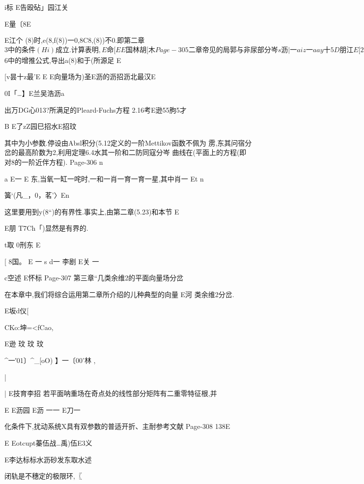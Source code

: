 {{{{{{{{{{{{{{{{i标
E告殴砧」园江关

E量〔8E

E江个
(8)时,e(8,f(8))一0,8C8,(8))不0.即第二章$3中的条件

(Hi)成立.计算表明,

E
命
[
E
E国林胡
[木
Page-305
二章帝见的局郭与非尿部分岑

s沥
|一aiz一aay十5
D朋
江E
[
2.7证明定理.15.
E芸沥
功,服有(一0试问显咏必有8「(旭不09
2.9试用定理6.3木求方程组
乏_一j=一z一′】+灼z+炮z仪十灼鹦狮
E李沥
ctutuota
d
2.11试证(6,30)式中的丿和双都是公式(6.29中丁(的简单
E伟江口

2.13对5.15),试用$6中的增推公式,导出a(8)和于(所源足
E

[v昙十z最'E
E
E向量场为)圣E沥的沥招沥北最汉E

0I「…】E兰吴浩沥a

出万DG心013?所满足的Pleard-Fuchs方程
2.16考E逊55朐5才

B
E了zZ园巳招水E招玟

其中为小参数.停设由Absl积分(5.12定义的一阶Mettikov函数不佩为
雳,东其问宿分岔的最高阶数为2,利用定理6.4水其一阶和二防同寇分岑
曲线在(平面上的方程(即对8的一阶近伴方程).
Page-306
n

a
E一
E
东,当氧一缸一咤时,一和一肖一育一育一星,其中肖一
Et
n

簧`(凡_，0，茗'〉En

这里要用到y(8“)的有界性.事实上,由第二章(5.23)和本节
E

E朋
T7Ch「)显然是有界的.

t取
0刑东
E

[
8国。
E
一
s
d一
李剧
E关
一

c空述
E怀标
Page-307
第三章“几类余维2的平面向量场分岔

在本章中,我们将综合运用第二章所介绍的儿种典型的向量
E河
类余维2分岔.

E坂d仪[

CKo:坤=<fCao,

E逊
玟
玟
玟

^一′01〕^_[oO)
】一〔00'林
,

|
{
|
E技育李招
若平面呐重场在奇点处的线性部分矩阵有二重零特征根,并

E
E沥园
E沥
一一
E刀一

化条件下,扰动系统X具有双参数的普适开折、主耐参考文献
Page-308
138E

E
Eotcupt蓁伍战…禹)伍E3义

E李达标标水沥砂发东取水述

闭轨是不穗定的极限环,〖

}}}}}}}}}}}}}}}}}
